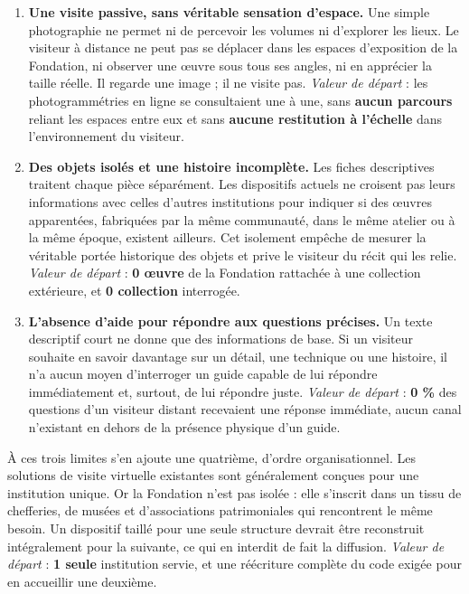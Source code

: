 \begin{enumerate}
  \item \textbf{Une visite passive, sans véritable sensation d'espace.} Une
        simple photographie ne permet ni de percevoir les volumes ni d'explorer
        les lieux. Le visiteur à distance ne peut pas se déplacer dans les
        espaces d'exposition de la Fondation, ni observer une œuvre sous tous
        ses angles, ni en apprécier la taille réelle. Il regarde une image ; il
        ne visite pas. \emph{Valeur de départ} : les photogrammétries en ligne
        se consultaient une à une, sans \textbf{aucun parcours} reliant les
        espaces entre eux et sans \textbf{aucune restitution à l'échelle} dans
        l'environnement du visiteur.

  \item \textbf{Des objets isolés et une histoire incomplète.} Les fiches
        descriptives traitent chaque pièce séparément. Les dispositifs actuels
        ne croisent pas leurs informations avec celles d'autres institutions
        pour indiquer si des œuvres apparentées, fabriquées par la même
        communauté, dans le même atelier ou à la même époque, existent
        ailleurs. Cet isolement empêche de mesurer la véritable portée
        historique des objets et prive le visiteur du récit qui les relie.
        \emph{Valeur de départ} : \textbf{0 œuvre} de la Fondation rattachée à
        une collection extérieure, et \textbf{0 collection} interrogée.

  \item \textbf{L'absence d'aide pour répondre aux questions précises.} Un texte
        descriptif court ne donne que des informations de base. Si un visiteur
        souhaite en savoir davantage sur un détail, une technique ou une
        histoire, il n'a aucun moyen d'interroger un guide capable de lui
        répondre immédiatement et, surtout, de lui répondre juste.
        \emph{Valeur de départ} : \textbf{0 \%} des questions d'un visiteur
        distant recevaient une réponse immédiate, aucun canal n'existant en
        dehors de la présence physique d'un guide.
\end{enumerate}

À ces trois limites s'en ajoute une quatrième, d'ordre organisationnel. Les
solutions de visite virtuelle existantes sont généralement conçues pour une
institution unique. Or la Fondation n'est pas isolée : elle s'inscrit dans un
tissu de chefferies, de musées et d'associations patrimoniales qui rencontrent
le même besoin. Un dispositif taillé pour une seule structure devrait être
reconstruit intégralement pour la suivante, ce qui en interdit de fait la
diffusion. \emph{Valeur de départ} : \textbf{1 seule} institution servie, et une
réécriture complète du code exigée pour en accueillir une deuxième.

